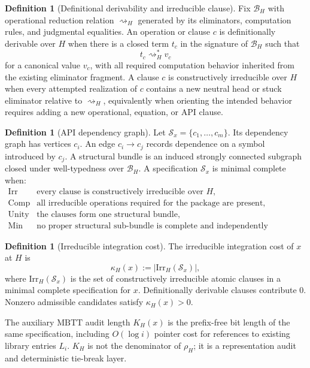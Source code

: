 \documentclass[11pt]{article}
\theoremstyle{plain}
\theoremstyle{definition}
\newtheorem{definition}[theorem]{Definition}
\theoremstyle{remark}
\newcommand{\MBTT}{\mathrm{MBTT}}
\newcommand{\B}{\mathcal{B}}
\begin{document}
\begin{definition}[Definitional derivability and irreducible clause]
Fix \(\B_H\) with operational reduction relation \(\rightsquigarrow_H\) generated by its eliminators, computation rules, and judgmental equalities. An operation or clause \(c\) is definitionally derivable over \(H\) when there is a closed term \(t_c\) in the signature of \(\B_H\) such that
\[
t_c\rightsquigarrow_H^{*} v_c
\]
for a canonical value \(v_c\), with all required computation behavior inherited from the existing eliminator fragment. A clause \(c\) is constructively irreducible over \(H\) when every attempted realization of \(c\) contains a new neutral head or stuck eliminator relative to \(\rightsquigarrow_H\), equivalently when orienting the intended behavior requires adding a new operational, equation, or API clause.
\end{definition}

\begin{definition}[API dependency graph]
Let \(\mathcal{S}_x=\{c_1,\ldots,c_m\}\). Its dependency graph has vertices \(c_i\). An edge \(c_i\to c_j\) records dependence on a symbol introduced by \(c_j\). A structural bundle is an induced strongly connected subgraph closed under well-typedness over \(\B_H\). A specification \(\mathcal{S}_x\) is minimal complete when:
\[
\begin{array}{ll}
\mathrm{Irr} & \text{every clause is constructively irreducible over }H,\\
\mathrm{Comp} & \text{all irreducible operations required for the package are present},\\
\mathrm{Unity} & \text{the clauses form one structural bundle},\\
\mathrm{Min} & \text{no proper structural sub-bundle is complete and independently acceptable.}
\end{array}
\]
\end{definition}

\begin{definition}[Irreducible integration cost]
The irreducible integration cost of \(x\) at \(H\) is
\[
\kappa_H(x):=
\left|\mathrm{Irr}_H(\mathcal{S}_x)\right|,
\]
where \(\mathrm{Irr}_H(\mathcal{S}_x)\) is the set of constructively irreducible atomic clauses in a minimal complete specification for \(x\). Definitionally derivable clauses contribute \(0\). Nonzero admissible candidates satisfy \(\kappa_H(x)>0\).

The auxiliary \(\MBTT\) audit length \(K_H(x)\) is the prefix-free bit length of the same specification, including \(O(\log i)\) pointer cost for references to existing library entries \(L_i\). \(K_H\) is not the denominator of \(\rho_H\); it is a representation audit and deterministic tie-break layer.
\end{definition}
\end{document}
